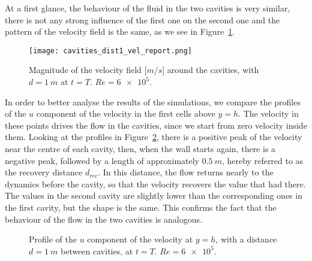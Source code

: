 At a first glance, the behaviour of the fluid in the two cavities is very 
similar, there is not any strong influence of the first one on the second one 
and the pattern of the velocity field is the same, as we see in Figure~\ref{fig:veld1}. 
\begin{figure}
	\centering
	\texttt{[image: cavities\_dist1\_vel\_report.png]}
	\caption[Magnitude of the velocity field in the cavities problem]{Magnitude of the velocity field [$\si{m/s}$] around the cavities, with $d=\SI{1}{m}$ at $t=T$. $Re=\num{6e5}$.}
	\label{fig:veld1}
\end{figure}
In order to better analyse the results of the simulations, we compare the 
profiles of the $u$ component of the velocity in the first cells above $y=h$. The velocity in these points drives the flow in the cavities, 
since we start from zero velocity inside them.
Looking at the profiles in Figure~\ref{fig:velprofile1}, there is a positive 
peak of the velocity near the centre of each cavity, then, when the wall starts 
again, there is a negative peak, followed by a
length of approximately $\SI{0.5}{m}$, hereby referred to as the recovery distance $d_{rec}$.
In this distance, the flow returns nearly to the dynamics before the cavity, so that the velocity recovers the value that had there.
The values in the second 
cavity are slightly lower than the corresponding ones in the first cavity, but 
the shape is the same. This confirms the fact that the behaviour of the flow 
in the two cavities is analogous.
\begin{figure}
	\centering
	
	\caption[Profile of the $u$ component of the velocity at $y=h$ in the cavities problem]{Profile of the $u$ component of the velocity at $y=h$, with a distance $d=\SI{1}{m}$ between cavities, at $t=T$. $Re = \num{6e5}$.}
	\label{fig:velprofile1}
\end{figure}

